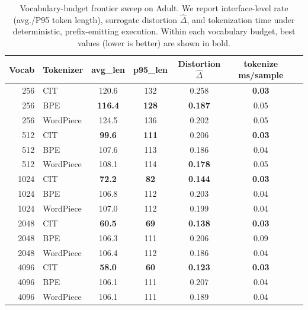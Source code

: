 \begin{table}[t]
\centering
\scriptsize
\setlength{\tabcolsep}{3.5pt}
\begin{tabular*}{\columnwidth}{@{\extracolsep{\fill}}rlccccc@{}}
\toprule
Vocab & Tokenizer & avg\_len & p95\_len & Distortion $\hat{\Delta}$ & tokenize ms/sample \\
\midrule
256 & CIT & 120.6 & 132 & 0.258 & \textbf{0.03} \\
256 & BPE & \textbf{116.4} & \textbf{128} & \textbf{0.187} & 0.05 \\
256 & WordPiece & 124.5 & 136 & 0.202 & 0.05 \\
\midrule
512 & CIT & \textbf{99.6} & \textbf{111} & 0.206 & \textbf{0.03} \\
512 & BPE & 107.6 & 113 & 0.186 & 0.04 \\
512 & WordPiece & 108.1 & 114 & \textbf{0.178} & 0.05 \\
\midrule
1024 & CIT & \textbf{72.2} & \textbf{82} & \textbf{0.144} & \textbf{0.03} \\
1024 & BPE & 106.8 & 112 & 0.203 & 0.04 \\
1024 & WordPiece & 107.0 & 112 & 0.199 & 0.04 \\
\midrule
2048 & CIT & \textbf{60.5} & \textbf{69} & \textbf{0.138} & \textbf{0.03} \\
2048 & BPE & 106.3 & 111 & 0.206 & 0.09 \\
2048 & WordPiece & 106.4 & 112 & 0.186 & 0.04 \\
\midrule
4096 & CIT & \textbf{58.0} & \textbf{60} & \textbf{0.123} & \textbf{0.03} \\
4096 & BPE & 106.1 & 111 & 0.207 & 0.04 \\
4096 & WordPiece & 106.1 & 111 & 0.189 & 0.04 \\
\bottomrule
\end{tabular*}
\caption{Vocabulary-budget frontier sweep on Adult. We report interface-level rate (avg./P95 token length), surrogate distortion $\hat{\Delta}$, and tokenization time under deterministic, prefix-emitting execution. Within each vocabulary budget, best values (lower is better) are shown in bold.}
\label{tab:frontier}
\end{table}
